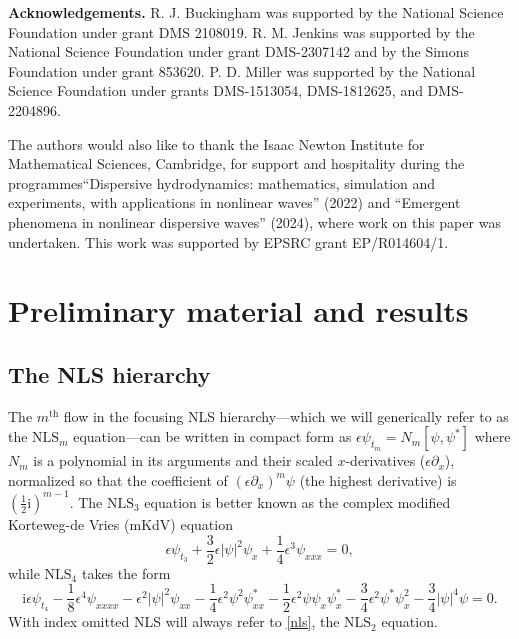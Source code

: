 \documentclass[12pt]{amsart}
\numberwithin{equation}{section}
\newcommand{\ii}{\mathrm{i}}
\begin{document}
\noindent
{\bf Acknowledgements.}
R. J. Buckingham was supported by the National Science Foundation under grant DMS 2108019. R. M. Jenkins was supported by the National Science Foundation under grant DMS-2307142 and by the Simons Foundation under grant 853620.  P. D. Miller was supported by the National Science Foundation under grants DMS-1513054, DMS-1812625, and DMS-2204896.

The authors would also like to thank the Isaac Newton Institute for Mathematical Sciences, Cambridge, for support and hospitality during the programmes``Dispersive hydrodynamics: mathematics, simulation and experiments, with applications in nonlinear waves'' (2022) and ``Emergent phenomena in nonlinear dispersive waves'' (2024), where work on this paper was undertaken. This work was supported by EPSRC grant EP/R014604/1. 

\section{Preliminary material and results}

\subsection{The NLS hierarchy}
\label{sec-hierarchy}
 The $m^\mathrm{th}$ flow in the focusing NLS hierarchy---which we will generically refer to as the $\mathrm{NLS}_m$ equation---can be written in compact form as $\epsilon\psi_{t_m}=N_m[\psi,\psi^*]$ where $N_m$ is a polynomial in its arguments and their scaled $x$-derivatives ($\epsilon\partial_x$), normalized so that the coefficient of $(\epsilon\partial_x)^m\psi$ (the highest derivative) is $(\frac{1}{2}\ii)^{m-1}$. The $\mathrm{NLS}_3$ equation is better known as the complex modified Korteweg-de Vries (mKdV) equation
\begin{equation}
\epsilon\psi_{t_3} + \frac{3}{2}\epsilon|\psi|^2\psi_x +\frac{1}{4}\epsilon^3\psi_{xxx}=0,
\label{eq:mKdV}
\end{equation}
while $\mathrm{NLS}_4$ takes the form
\begin{equation}
\ii\epsilon\psi_{t_4}-\frac{1}{8}\epsilon^4\psi_{xxxx}-\epsilon^2 |\psi|^2\psi_{xx}-\frac{1}{4}\epsilon^2\psi^2\psi^*_{xx}-\frac{1}{2}\epsilon^2\psi\psi_x\psi^*_x-\frac{3}{4}\epsilon^2\psi^*\psi_x^2 -\frac{3}{4}|\psi|^4\psi=0.
\label{eq:LPD}
\end{equation}
With index omitted NLS will always refer to \eqref{nls}, the $\mathrm{NLS}_2$ equation.
\end{document}
